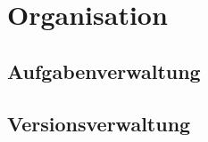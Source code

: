 \chapter{Organisation}
\label{cha:Organisation}

\section{Aufgabenverwaltung}
\label{sec:aufgabenverwaltung}


\section{Versionsverwaltung}
\label{sec:versionsverwaltung}
